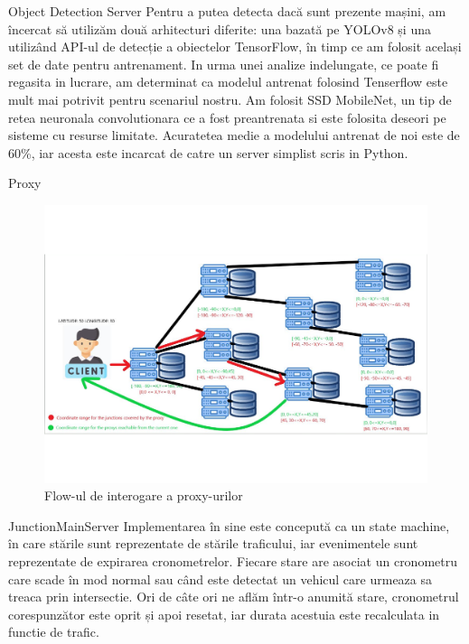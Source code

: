 \documentclass{beamer}
\begin{document}
    \begin{frame}{Object Detection Server}
        Pentru a putea detecta dacă sunt prezente mașini, am încercat
        să utilizăm două arhitecturi diferite: una bazată pe YOLOv8 și
        una utilizând API-ul de detecție a obiectelor TensorFlow, în
        timp ce am folosit același set de date pentru antrenament.
        In urma unei analize indelungate, ce poate fi regasita in lucrare, 
        am determinat ca modelul antrenat folosind Tenserflow este mult 
        mai potrivit pentru scenariul nostru. Am folosit SSD MobileNet, un 
        tip de retea neuronala convolutionara ce a fost preantrenata si 
        este folosita deseori pe sisteme cu resurse limitate. Acuratetea medie 
        a modelului antrenat de noi este de 60\%, iar acesta este incarcat de 
        catre un server simplist scris in Python.
    \end{frame}

    \begin{frame}{Proxy}
        \begin{figure}[h!]
            \includegraphics[width=(\textwidth / 6) * 5]{Sketches/ProxyFlowV2.png}
            \caption{Flow-ul de interogare a proxy-urilor}
            \label{fig:Proxy querys flow}
        \end{figure}
    \end{frame}


    \begin{frame}{JunctionMainServer}
        Implementarea în sine este concepută ca un state machine, 
        în care stările sunt reprezentate de stările traficului,
        iar evenimentele sunt reprezentate de expirarea cronometrelor.
        Fiecare stare are asociat un cronometru care scade în mod
        normal sau când este detectat un vehicul care urmeaza sa treaca
        prin intersectie. Ori de câte ori ne aflăm într-o anumită stare,
        cronometrul corespunzător este oprit și apoi resetat, iar 
        durata acestuia este recalculata in functie de trafic.
    \end{frame}
\end{document}

